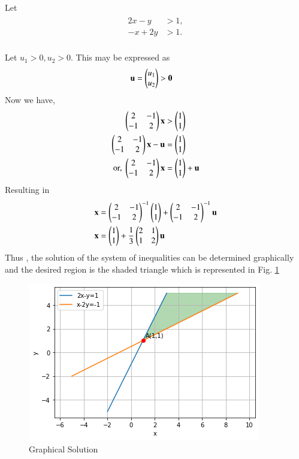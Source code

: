 
%
Let
\begin{align}
\label{eq:1}
\begin{split}
2x-y &> 1,
\\-x+2y &> 1.
\end{split}
\end{align}
\\
Let $u_1 > 0, u_2 > 0$. This may be expressed as
\begin{align}
\mathbf{u} = \begin{pmatrix}u_1\\u_2\end{pmatrix} &> \mathbf{0}
\end{align}
Now we have,
\begin{align}
\begin{pmatrix}2&-1 \\ -1&2 \end{pmatrix}\mathbf{x} &> \begin{pmatrix}1 \\ 1\end{pmatrix}   
\\
\begin{pmatrix}2&-1 \\ -1&2 \end{pmatrix}\mathbf{x}-\mathbf{u} &= \begin{pmatrix}1 \\ 1\end{pmatrix} 
\\
\text{or, } \begin{pmatrix}2&-1 \\ -1&2 \end{pmatrix}\mathbf{x} &= \begin{pmatrix}1 \\ 1\end{pmatrix}  + \mathbf{u}
\end{align}
Resulting in
\begin{align}
\mathbf{x} &= \begin{pmatrix}2 & -1 \\ -1 & 2\end{pmatrix}^{-1}\begin{pmatrix}1 \\ 1\end{pmatrix} +\begin{pmatrix}2 & -1 \\ -1 & 2\end{pmatrix}^{-1} \mathbf{u}
\\
\mathbf{x }&=\begin{pmatrix}1 \\ 1\end{pmatrix} +\frac{1}{3}\begin{pmatrix}2 & 1 \\ 1 & 2\end{pmatrix}\mathbf{u}
\end{align} 
Thus , the solution of the system of inequalities can be determined graphically and the desired region is the shaded triangle which is represented in Fig. \ref{fig: Graphical Solution}
\begin{figure}[!ht]
\includegraphics[width=\columnwidth]{solutions/su2021/2/50/Graphical Solution.png}
\caption{Graphical Solution}
\label{fig: Graphical Solution}
\end{figure}

